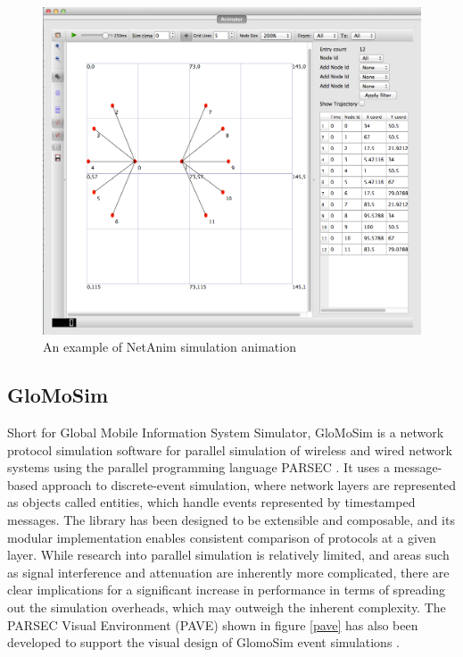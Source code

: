 \begin{figure}
\centering	
\includegraphics[scale=0.3]{img/netanim}	
\caption{An example of NetAnim simulation animation}
\label{netanim}
\end{figure}

\subsection{GloMoSim}
Short for Global Mobile Information System Simulator, GloMoSim is a network protocol simulation software for parallel simulation of wireless and wired network systems using the parallel programming language PARSEC \cite{zengxiang1998}. It uses a message-based approach to discrete-event simulation, where network layers are represented as objects called entities, which handle events represented by timestamped messages. The library has been designed to be extensible and composable, and its modular implementation enables consistent comparison of protocols at a given layer. While research into parallel simulation is relatively limited, and areas such as signal interference and attenuation are inherently more complicated, there are clear implications for a significant increase in performance in terms of spreading out the simulation overheads, which may outweigh the inherent complexity. The PARSEC Visual Environment (PAVE) shown in figure \ref{pave} has also been developed to support the visual design of GlomoSim event simulations \cite{luchogie2006}.

